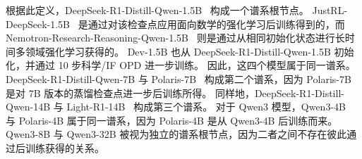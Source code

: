 根据此定义，DeepSeek-R1-Distill-Qwen-1.5B~\cite{guo2025deepseekr1} 构成一个谱系根节点。  
JustRL-DeepSeek-1.5B~\cite{he2025justrl} 是通过对该检查点应用面向数学的强化学习后训练得到的，而  
Nemotron-Research-Reasoning-Qwen-1.5B~\cite{liu2026prorl} 则是通过从相同初始化状态进行长时间多领域强化学习获得的。  
Dev-1.5B 也从 DeepSeek-R1-Distill-Qwen-1.5B 初始化，并通过 10 步科学/IF OPD 进一步训练。  
因此，这四个模型属于同一谱系。  
DeepSeek-R1-Distill-Qwen-7B 与 Polaris-7B~\cite{Polaris2025} 构成第二个谱系，因为 Polaris-7B 是对 7B 版本的蒸馏检查点进一步后训练所得。  
同样地，DeepSeek-R1-Distill-Qwen-14B 与 Light-R1-14B~\cite{wen2025lightr1} 构成第三个谱系。  
对于 Qwen3 模型，Qwen3-4B~\cite{yang2025qwen3} 与 Polaris-4B 属于同一谱系，因为 Polaris-4B 是从 Qwen3-4B 后训练而来。  
Qwen3-8B 与 Qwen3-32B 被视为独立的谱系根节点，因为二者之间不存在彼此通过后训练获得的关系。

